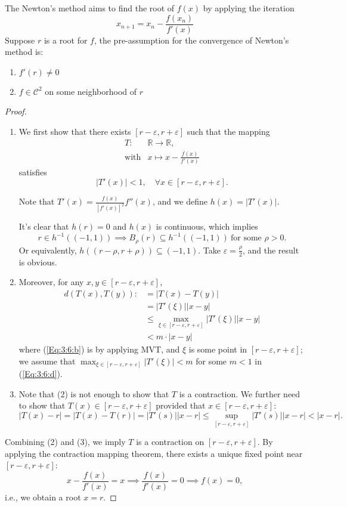 \begin{example}
The Newton's method aims to find the root of $f(x)$ by applying the iteration
\[
x_{n+1}=x_n-\frac{f(x_n)}{f'(x)}
\]
Suppose $r$ is a root for $f$, the pre-assumption for the convergence of Newton's method is:
\begin{enumerate}
\item
$f'(r)\ne0$
\item
$f\in\mathcal{C}^2$ on some neighborhood of $r$
\end{enumerate}
\begin{proof}
\begin{enumerate}
\item
We first show that there exists $[r-\varepsilon,r+\varepsilon]$ such that the mapping
\[
\begin{array}{ll}
T:&\mathbb{R}\to\mathbb{R},\\
\text{with}&
x\mapsto x-\frac{f(x)}{f'(x)}
\end{array}
\]
satisfies 
\begin{equation}\label{my:Eq:3:6}
|T'(x)|<1,\quad
\forall x\in[r-\varepsilon,r+\varepsilon].
\end{equation}

Note that $T'(x)=\frac{f(x)}{[f'(x)]^2}f''(x)$, and we define $h(x)=|T'(x)|$.

It's clear that $h(r)=0$ and $h(x)$ is continuous, which implies
\[
r\in h^{-1}((-1,1))\implies
B_\rho(r)\subseteq h^{-1}((-1,1))\ \text{for some $\rho>0$}.
\]
Or equivalently, $h((r-\rho,r+\rho))\subseteq(-1,1)$. Take $\varepsilon=\frac{\rho}{2}$, and the result is obvious.
\item
Moreover, for any $x,y\in [r-\varepsilon,r+\varepsilon]$,
\begin{subequations}
\begin{align}
d(T(x),T(y)):&=|T(x)-T(y)|\label{Eq:3:6:a}\\
&=|T'(\xi)||x-y|\label{Eq:3:6:b}\\
&\le\max_{\xi\in [r-\varepsilon,r+\varepsilon]}|T'(\xi)||x-y|\label{Eq:3:6:c}\\
&<m\cdot|x-y|\label{Eq:3:6:d}
\end{align}
\end{subequations}
where (\ref{Eq:3:6:b}) is by applying MVT, and $\xi$ is some point in $[r-\varepsilon,r+\varepsilon]$; we assume that $\max_{\xi\in [r-\varepsilon,r+\varepsilon]}|T'(\xi)|<m$ for some $m<1$ in (\ref{Eq:3:6:d}).
\item
Note that (2) is not enough to show that $T$ is a contraction.
We further need to show that $T(x)\in [r-\varepsilon,r+\varepsilon]$ provided that $x\in [r-\varepsilon,r+\varepsilon]$:
\[
|T(x)-r|=|T(x)-T(r)|=|T'(s)||x-r|\le\sup_{[r-\varepsilon,r+\varepsilon]}|T'(s)||x-r|<|x-r|.
\]
\end{enumerate}
Combining (2) and (3), we imply $T$ is a contraction on $[r-\varepsilon,r+\varepsilon]$.
By applying the contraction mapping theorem, there exists a unique fixed point near $[r-\varepsilon,r+\varepsilon]$:
\[
x-\frac{f(x)}{f'(x)}=x\implies\frac{f(x)}{f'(x)}=0\implies f(x)=0,
\]
i.e., we obtain a root $x=r$.
\end{proof}


\end{example}
